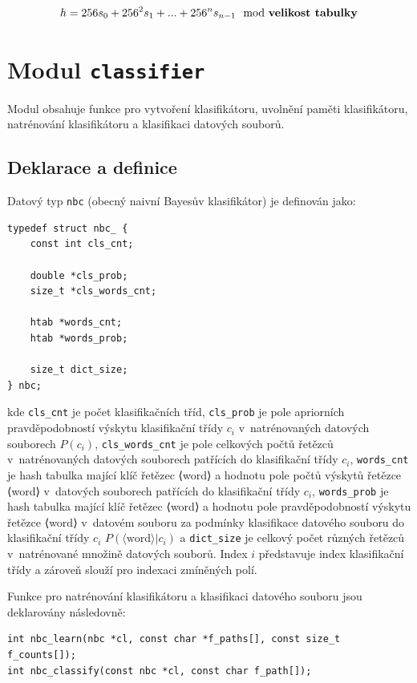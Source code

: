 \documentclass[a4paper, 12pt]{report}
\begin{document}
\begin{equation}
    h = 256 s_0 + 256^2 s_1 + ... + 256^n s_{n-1} \mod \text{\textbf{velikost tabulky}}
    \label{equ:htab-hcode}
\end{equation}

\section{Modul \texttt{classifier}}

Modul obsahuje funkce pro vytvoření klasifikátoru, uvolnění paměti 
klasifikátoru, natrénování klasifikátoru a klasifikaci datových souborů.

\subsection{Deklarace a definice}

Datový typ \texttt{nbc} (obecný naivní Bayesův klasifikátor) je definován 
jako:

\begin{lstlisting}
typedef struct nbc_ {
    const int cls_cnt;

    double *cls_prob;
    size_t *cls_words_cnt;

    htab *words_cnt;
    htab *words_prob;
    
    size_t dict_size;
} nbc;
\end{lstlisting}

kde \texttt{cls\_cnt} je počet klasifikačních tříd, \texttt{cls\_prob} je 
pole apriorních pravděpodobností výskytu klasifikační třídy $c_i$
v~natrénovaných datových souborech $P(c_i)$, \texttt{cls\_words\_cnt} je 
pole celkových počtů řetězců v~natrénovaných datových souborech patřících 
do klasifikační třídy $c_i$, \texttt{words\_cnt} je hash tabulka mající 
klíč řetězec ⟨word⟩ a hodnotu pole počtů výskytů řetězce ⟨word⟩ v~datových 
souborech patřících do klasifikační třídy $c_i$, \texttt{words\_prob} je 
hash tabulka mající klíč řetězec ⟨word⟩ a hodnotu pole pravděpodobností 
výskytu řetězce ⟨word⟩ v~datovém souboru za podmínky klasifikace datového 
souboru do klasifikační třídy $c_i$ $P(\langle \text{word} \rangle|c_i)$ a 
\texttt{dict\_size} je celkový počet různých řetězců v~natrénované množině 
datových souborů. Index $i$ představuje index klasifikační třídy a zároveň 
slouží pro indexaci zmíněných polí.

Funkce pro natrénování klasifikátoru a klasifikaci datového souboru jsou 
deklarovány následovně:

\begin{lstlisting}
int nbc_learn(nbc *cl, const char *f_paths[], const size_t f_counts[]);
int nbc_classify(const nbc *cl, const char f_path[]);
\end{lstlisting}
\end{document}
